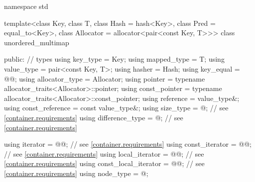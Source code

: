 \begin{codeblock}
namespace std {
  template<class Key,
           class T,
           class Hash = hash<Key>,
           class Pred = equal_to<Key>,
           class Allocator = allocator<pair<const Key, T>>>
  class unordered_multimap {
  public:
    // types
    using key_type             = Key;
    using mapped_type          = T;
    using value_type           = pair<const Key, T>;
    using hasher               = Hash;
    using key_equal            = @@;
    using allocator_type       = Allocator;
    using pointer              = typename allocator_traits<Allocator>::pointer;
    using const_pointer        = typename allocator_traits<Allocator>::const_pointer;
    using reference            = value_type&;
    using const_reference      = const value_type&;
    using size_type            = @\impdef@; // see \ref{container.requirements}
    using difference_type      = @\impdef@; // see \ref{container.requirements}

    using iterator             = @@; // see \ref{container.requirements}
    using const_iterator       = @@; // see \ref{container.requirements}
    using local_iterator       = @@; // see \ref{container.requirements}
    using const_local_iterator = @@; // see \ref{container.requirements}
    using node_type            = @\unspec@;

}}
\end{codeblock}
